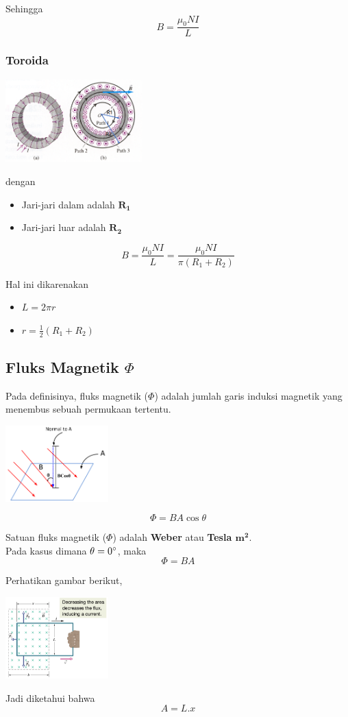 \documentclass[twocolumn, 11pt]{article}%
\begin{document}
Sehingga
\[B=\frac{\mu_0 NI}{L} \]

\subsubsection{Toroida}%
\begin{center}
    \includegraphics[width=200px]{10.png}
\end{center}

dengan
\begin{itemize}
    \item Jari-jari dalam adalah $\mathbf{R_1}$
    \item Jari-jari luar adalah $\mathbf{R_2}$
\end{itemize}


\[B=\frac{\mu_0 NI}{L} = \frac{\mu_0 NI}{\pi(R_1+R_2)} \]

Hal ini dikarenakan
\begin{itemize}
    \item $L=2\pi r$
    \item $\displaystyle r=\frac12 (R_1+R_2)$
\end{itemize}

\subsection{Fluks Magnetik $\Phi$}%
Pada definisinya, fluks magnetik ($\Phi$) adalah jumlah garis induksi
magnetik yang menembus sebuah permukaan tertentu.

\begin{center}
    \includegraphics[width=150px]{11.png}
\end{center}

\[\Phi=BA\cos\theta \]

Satuan fluks magnetik ($\Phi$) adalah \textbf{Weber} atau \textbf{Tesla
$\mathbf{m^2}$}.\\

Pada kasus dimana $\theta=0\degree$, maka
\[\Phi=BA \]

Perhatikan gambar berikut,
\begin{center}
    \includegraphics[width=150px]{12.png}
\end{center}

Jadi diketahui bahwa
\[A=L.x\]
\end{document}
